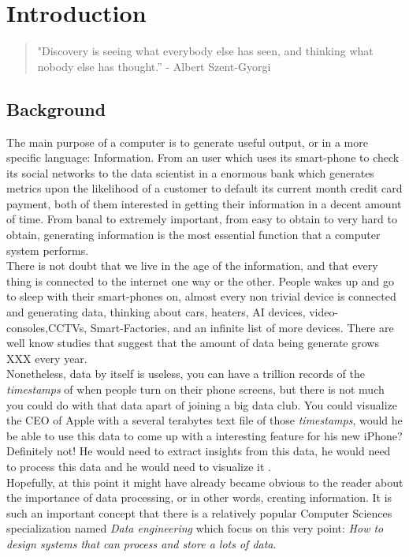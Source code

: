 \section{Introduction}

\begin{verse} "Discovery is seeing what everybody else has seen, and thinking
what nobody else has thought.” - Albert Szent-Gyorgi \end{verse}

\subsection{Background} The main purpose of a computer is to generate useful
output, or in a more specific language: Information. From an user which uses its
smart-phone to check its social networks to the data scientist in a enormous
bank which generates metrics upon the likelihood of a customer to default its
current month credit card payment, both of them interested in getting their
information in a decent amount of time. From banal to extremely important, from
easy to obtain to very hard to obtain, generating information is the most
essential function that a computer system performs. \\

There is not doubt that we live in the age of the information, and that every
thing is connected to the internet one way or the other. People wakes up and go
to sleep with their smart-phones on, almost every non trivial device is
connected and generating data, thinking about cars, heaters, AI devices,
video-consoles,CCTVs, Smart-Factories, and an infinite list of more devices.
There are well know studies that suggest that the amount of data being generate
grows XXX every year. \\ 

Nonetheless, data by itself is useless, you can have a trillion records of the
\textit{timestamps} of when people turn on their phone screens, but there is not
much you could do with that data apart of joining a big data club. You could
visualize the CEO of Apple with a several terabytes text file of those
\textit{timestamps}, would he be able to use this data to come up with a
interesting feature for his new iPhone? Definitely not! He would need to extract
insights from this data, he would need to process this data and he would need to
visualize it \-. \\

Hopefully, at this point it might have already became obvious to the reader
about the importance of data processing, or in other words, creating
information. It is such an important concept that there is a relatively popular
Computer Sciences specialization named \textit{Data engineering} which focus on
this very point: \textit{How to design systems that can process and store a lots
of data}. \\

